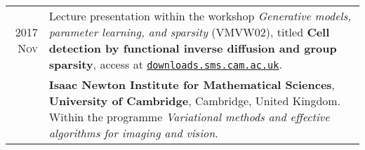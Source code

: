 \documentclass[a4paper,10pt]{article}
\begin{document}
\begin{longtable}[H]{r|p{13.5cm}}
  \textsc{2017 Nov} & Lecture presentation within the workshop \emph{Generative models,
                      parameter learning, and sparsity} (VMVW02), titled
                      \textbf{Cell detection by functional inverse diffusion and group sparsity},
                      access at \href{https://downloads.sms.cam.ac.uk/2600830/2600858.mp4}{\texttt{downloads.sms.cam.ac.uk}}. \\
                  & \footnotesize{\textbf{Isaac Newton Institute for Mathematical Sciences},
                    \textbf{University of Cambridge}, Cambridge, United Kingdom.
                    Within the programme \emph{Variational methods and effective
                    algorithms for imaging and vision}.}\\

\end{longtable}




\end{document}

